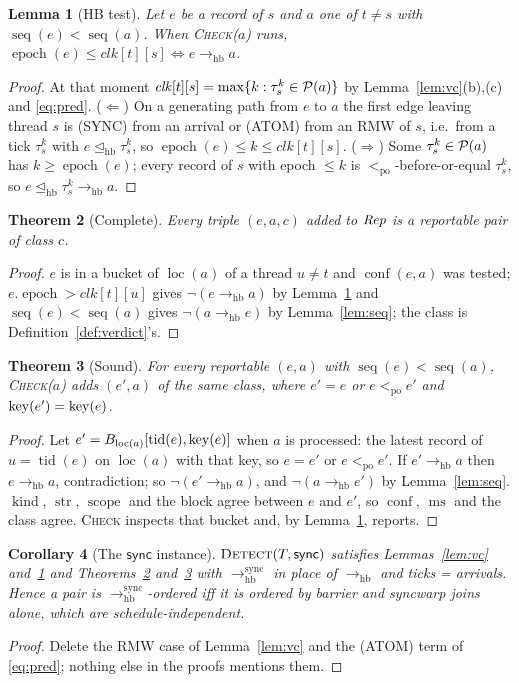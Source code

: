 \documentclass[11pt]{article}
\newtheorem{theorem}{Theorem}
\newtheorem{lemma}[theorem]{Lemma}
\newtheorem{corollary}[theorem]{Corollary}
\theoremstyle{remark}
\DeclareMathOperator{\tid}{tid}\DeclareMathOperator{\pc}{pc}\DeclareMathOperator{\seq}{seq}
\DeclareMathOperator{\loc}{loc}\DeclareMathOperator{\blk}{blk}\DeclareMathOperator{\kind}{kind}
\DeclareMathOperator{\str}{str}\DeclareMathOperator{\scope}{scope}\DeclareMathOperator{\epoch}{epoch}
\DeclareMathOperator{\conf}{conf}\DeclareMathOperator{\ms}{ms}\DeclareMathOperator{\incl}{incl}
\newcommand{\PO}{<_{\mathrm{po}}}\newcommand{\HB}{\to_{\mathrm{hb}}}\newcommand{\HBr}{\trianglelefteq_{\mathrm{hb}}}
\newcommand{\clk}{\mathit{clk}}\newcommand{\Bk}{B}\newcommand{\Ch}{\mathit{Ch}}\newcommand{\lastr}{\mathit{last}}
\begin{document}
\begin{lemma}[HB test]\label{lem:test}
Let $e$ be a record of $s$ and $a$ one of $t\ne s$ with $\seq(e)<\seq(a)$. When
\textsc{Check}($a$) runs, $\epoch(e)\le\clk[t][s]\iff e\HB a$.
\end{lemma}
\begin{proof}
At that moment $\clk[t][s]=\max\{k:\tau^k_s\in\Pred(a)\}$ by Lemma~\ref{lem:vc}(b),(c) and
\eqref{eq:pred}. ($\Leftarrow$) On a generating path from $e$ to $a$ the first edge leaving
thread $s$ is (SYNC) from an arrival or (ATOM) from an RMW of $s$, i.e.\ from a tick
$\tau^k_s$ with $e\HBr\tau^k_s$, so $\epoch(e)\le k\le\clk[t][s]$. ($\Rightarrow$) Some
$\tau^k_s\in\mathcal{P}(a)$ has $k\ge\epoch(e)$; every record of $s$ with epoch $\le k$ is
$\PO$-before-or-equal $\tau^k_s$, so $e\HBr\tau^k_s\HB a$.
\end{proof}

\begin{theorem}[Complete]\label{thm:complete}
Every triple $(e,a,c)$ added to $\mathit{Rep}$ is a reportable pair of class $c$.
\end{theorem}
\begin{proof}
$e$ is in a bucket of $\loc(a)$ of a thread $u\ne t$ and $\conf(e,a)$ was tested;
$e.\epoch>\clk[t][u]$ gives $\neg(e\HB a)$ by Lemma~\ref{lem:test} and
$\seq(e)<\seq(a)$ gives $\neg(a\HB e)$ by Lemma~\ref{lem:seq}; the class is
Definition~\ref{def:verdict}'s.
\end{proof}

\begin{theorem}[Sound]\label{thm:sound}
For every reportable $(e,a)$ with $\seq(e)<\seq(a)$, \textsc{Check}($a$) adds $(e',a)$ of
the same class, where $e'=e$ or $e\PO e'$ and $\operatorname{key}(e')=\operatorname{key}(e)$.
\end{theorem}
\begin{proof}
Let $e'=\Bk_{\loc(a)}[\tid(e),\key(e)]$ when $a$ is processed: the latest record of
$u=\tid(e)$ on $\loc(a)$ with that key, so $e=e'$ or $e\PO e'$. If $e'\HB a$ then $e\HB a$,
contradiction; so $\neg(e'\HB a)$, and $\neg(a\HB e')$ by Lemma~\ref{lem:seq}. $\kind$,
$\str$, $\scope$ and the block agree between $e$ and $e'$, so $\conf$, $\ms$ and the class
agree. \textsc{Check} inspects that bucket and, by Lemma~\ref{lem:test}, reports.
\end{proof}

\begin{corollary}[The $\mathsf{sync}$ instance]\label{cor:sync}
$\textsc{Detect}(T,\mathsf{sync})$ satisfies Lemmas~\ref{lem:vc} and~\ref{lem:test} and
Theorems~\ref{thm:complete} and~\ref{thm:sound} with $\HB^{\mathrm{sync}}$ in place of
$\HB$ and ticks = arrivals. Hence a pair is $\HB^{\mathrm{sync}}$-ordered iff it is
ordered by barrier and syncwarp joins alone, which are schedule-independent.
\end{corollary}
\begin{proof}
Delete the RMW case of Lemma~\ref{lem:vc} and the (ATOM) term of \eqref{eq:pred}; nothing
else in the proofs mentions them.
\end{proof}
\end{document}
